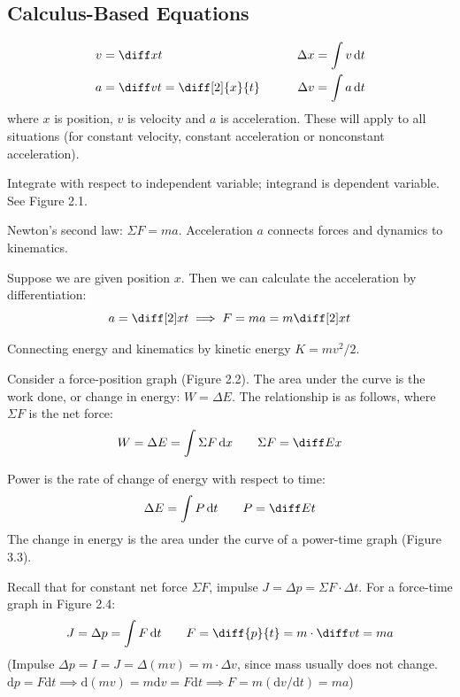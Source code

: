 \documentclass{article}
\newcommand{\theorem}[2]{\begin{tcolorbox}[title={#1},colback=blue!5!white,colframe=blue!75!black,parbox=false] #2 \end{tcolorbox}}
\begin{document}
\subsection{Calculus-Based Equations}

\theorem{Kinematics}{
	\begin{alignat*}{2}
		v&=\diff xt &\qquad \Delta x=\int v\,\mathrm{d}t \\
		a&=\diff vt=\diff[2]{x}{t} &\qquad \Delta v=\int a\,\mathrm{d}t
	\end{alignat*}
	where $x$ is position, $v$ is velocity and $a$ is acceleration. These will apply to all situations (for constant velocity, constant acceleration or nonconstant acceleration).
}

Integrate with respect to independent variable; integrand is dependent variable. See Figure 2.1.

\theorem{Connecting dynamics/forces and kinematics}{
Newton's second law: $\Sigma F=ma$. Acceleration $a$ connects forces and dynamics to kinematics.

Suppose we are given position $x$. Then we can calculate the acceleration by differentiation:
\begin{equation*}
	a=\diff[2]xt
	\implies F=ma=m\diff[2]xt
\end{equation*}
}

Connecting energy and kinematics by kinetic energy $K=mv^2/2$.

\theorem{Work and force-position graphs}{
	Consider a force-position graph (Figure 2.2). The area under the curve is the work done, or change in energy: $W=\Delta E$. The relationship is as follows, where $\Sigma F$ is the net force:
	\begin{equation*}
	    W=\Delta E=\int\Sigma  F\,\mathrm{d}x
		\qquad \Sigma F=\diff Ex
	\end{equation*}
}

\theorem{Power and time}{
	Power is the rate of change of energy with respect to time:
	\begin{equation*}
		\Delta E=\int P\,\mathrm{d}t \qquad P=\diff Et
	\end{equation*}
	The change in energy is the area under the curve of a power-time graph (Figure 3.3).
}

\theorem{Force and time}{
	Recall that for constant net force $\Sigma F$, impulse $J=\Delta p=\Sigma F\cdot \Delta t$. For a force-time graph in Figure 2.4:
	\begin{equation*}
	    J=\Delta p=\int F\,\mathrm{d}t
		\qquad 
		F=\diff{p}{t}=m\cdot \diff vt=ma
	\end{equation*}
	(Impulse $\Delta p=I=J=\Delta(mv)=m \cdot \Delta v$, since mass usually does not change. $\mathrm{d}p=F\mathrm{d} t \implies \mathrm{d}(mv)=m\mathrm{d} v=F\mathrm{d} t\implies F=m(\mathrm{d}v/\mathrm{d}t)=ma$)
}
\end{document}
